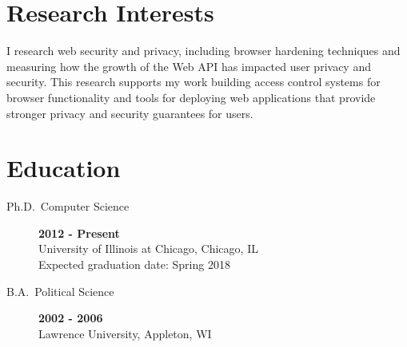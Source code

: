 \documentclass{vitae}
\author{Peter Snyder}
\begin{document}
  \maketitle

  \section{Research Interests}
  \begin{description}
      \item{\noindent I research web security and privacy, including browser hardening techniques and
          measuring how the growth of the Web API has impacted user privacy and security.
          This research supports my work building access control systems for
          browser functionality and tools for deploying web applications that
          provide stronger privacy and security guarantees for users.}
  \end{description}

  \section{Education}
  \begin{description}
    \item[Ph.D.~Computer Science] \hfill \textbf{2012 - Present}\\
    University of Illinois at Chicago, Chicago, IL\\
    Expected graduation date: Spring 2018

    \item[B.A.~Political Science] \hfill \textbf{2002 - 2006}~\\
    Lawrence University, Appleton, WI
  \end{description}

  
    \nocite{snyder2017browser}
    \nocite{snyder2017doxing}
    \nocite{snyder2017cdf}
    \nocite{snyder2016browser}
    \nocite{snyder2016characterizing}
    \nocite{snyder2016phishing}
    \nocite{snyder2015no}
    \nocite{clark2015saw}
    \nocite{snyder2014yao}
    \nocite{snyder2014cloudsweeper}
    \nocite{snyder2013cloudsweeper}
  
\end{document}
